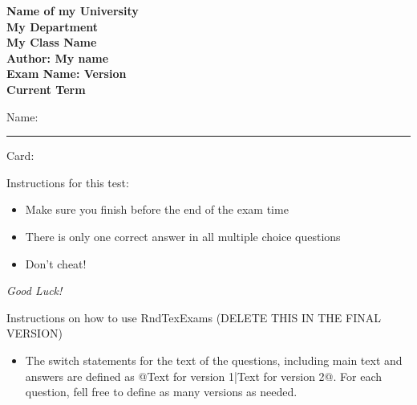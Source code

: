 \documentclass[10pt]{examdesign}
\newcommand{\myversion}{} %
\newcommand{\UniName}{Name of my University}
\newcommand{\DeptName}{My Department}
\newcommand{\ClassName}{My Class Name}
\newcommand{\MyName}{Author: My name}
\newcommand{\ExamName}{Exam Name: Version \myversion}
\newcommand{\TermName}{Current Term}
\begin{document}
    
    \begin{examtop}
    
    \begin{center}
        \textbf{\Large \UniName} \\
        \textbf{\Large \DeptName} \vspace{0.5cm}  \\
        \textbf{\Large \ClassName} \\
        \textbf{\Large \MyName} \\
        \textbf{\Large \ExamName } \\
        \textbf{\Large \TermName}
     \end{center}
    
    \vspace{1cm}
    Name: \rule{4in}{.4pt}  \quad  \noindent Card:\enspace\hrulefill
    
    
    \vspace{1cm}
    
    \small
    
    \begin{framed}
    
    Instructions for this test:
    
    \begin{itemize}
    
        \item Make sure you finish before the end of the exam time
    
        \item There is only one correct answer in all multiple choice questions
    
        \item Don't cheat!
    
    \end{itemize}
    
    \vspace{0.5cm}
    
    {\large \emph{Good Luck!}}
    \end{framed}
    
    \begin{framed}
        Instructions on how to use RndTexExams (DELETE THIS IN THE FINAL VERSION)
        \begin{itemize}
    
            \item The switch statements for the text of the questions, including main text and answers are defined as @{Text for version 1}|{Text for version 2}@. For each question, fell free to define as many versions as needed.
    

\end{itemize}
\end{framed}
\end{examtop}
\end{document}
